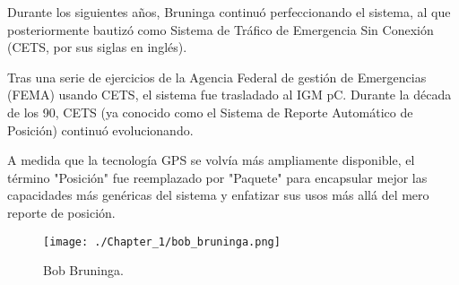 Durante los siguientes años, Bruninga continuó perfeccionando el sistema, al que posteriormente bautizó como Sistema de Tráfico de Emergencia Sin Conexión (CETS, por sus siglas en inglés).

Tras una serie de ejercicios de la Agencia Federal de gestión de Emergencias (FEMA) usando CETS, el sistema fue trasladado al IGM pC. Durante la década de los 90, CETS (ya conocido como el Sistema de Reporte Automático de Posición) continuó evolucionando.

A medida que la tecnología GPS se volvía más ampliamente disponible, el término "Posición" fue reemplazado por "Paquete" para encapsular mejor las capacidades más genéricas del sistema y enfatizar sus usos más allá del mero reporte de posición.

\begin{figure}[h!]
	\centering
	\texttt{[image: ./Chapter\_1/bob\_bruninga.png]}
	\caption{Bob Bruninga.}
	\label{fig:bob-bruninga}
\end{figure}